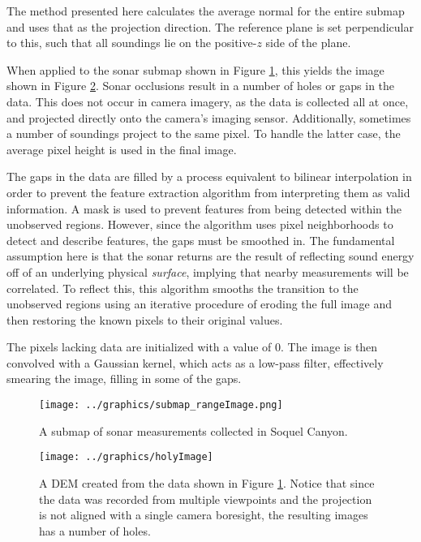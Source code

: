 The method presented here calculates the average normal for the entire submap and uses that as the projection direction. The reference plane is set perpendicular to this, such that all soundings lie on the positive-$z$ side of the plane.

When applied to the sonar submap shown in Figure \ref{fig:submap_rangeImage}, this yields the image shown in Figure \ref{fig:holyImage}. Sonar occlusions result in a number of holes or gaps in the data. This does not occur in camera imagery, as the data is collected  all at once, and projected directly onto the camera's imaging sensor. Additionally, sometimes a number of soundings project to the same pixel. To handle the latter case, the average pixel height is used in the final image. 

The gaps in the data are filled by a process equivalent to bilinear interpolation in order to prevent the feature extraction algorithm from interpreting them as valid information. A mask is used to prevent features from being detected within the unobserved regions. However, since the algorithm uses pixel neighborhoods to detect and describe features, the gaps must be smoothed in. The fundamental assumption here is that the sonar returns are the result of reflecting sound energy off of an underlying physical \emph{surface}, implying that nearby measurements will be correlated.  To reflect this, this algorithm smooths the transition to the unobserved regions using an iterative procedure of eroding the full image and then restoring the known pixels to their original values.

The pixels lacking data are initialized with a value of $0$. The image is then convolved with a Gaussian kernel, which acts as a low-pass filter, effectively smearing the image, filling in some of the gaps. 

\begin{figure}[htb]
   \centering
   \texttt{[image: ../graphics/submap\_rangeImage.png]} %
   \caption{A submap of sonar measurements collected in Soquel Canyon.}
   \label{fig:submap_rangeImage}
\end{figure}

\begin{figure}[htb]
   \centering
   \texttt{[image: ../graphics/holyImage]} %
   \caption{A DEM created from the data shown in Figure \ref{fig:submap_rangeImage}. Notice that since the data was recorded from multiple viewpoints and the projection is not aligned with a single camera boresight, the resulting images has a number of holes.}
   \label{fig:holyImage}
\end{figure}

